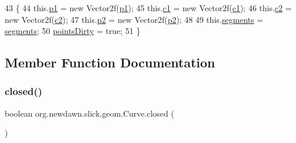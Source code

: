 \begin{DoxyCode}
43                                                                                    \{
44         this.\mbox{\hyperlink{classorg_1_1newdawn_1_1slick_1_1geom_1_1_curve_adb4d7ee49a8465099730d207e1edcdb9}{p1}} = \textcolor{keyword}{new} Vector2f(\mbox{\hyperlink{classorg_1_1newdawn_1_1slick_1_1geom_1_1_curve_adb4d7ee49a8465099730d207e1edcdb9}{p1}});
45         this.\mbox{\hyperlink{classorg_1_1newdawn_1_1slick_1_1geom_1_1_curve_aabfe639054bf41d5e2293bfa0190425b}{c1}} = \textcolor{keyword}{new} Vector2f(\mbox{\hyperlink{classorg_1_1newdawn_1_1slick_1_1geom_1_1_curve_aabfe639054bf41d5e2293bfa0190425b}{c1}});
46         this.\mbox{\hyperlink{classorg_1_1newdawn_1_1slick_1_1geom_1_1_curve_a7bfa1bc4b7842bd895dcd43300b9b7f7}{c2}} = \textcolor{keyword}{new} Vector2f(\mbox{\hyperlink{classorg_1_1newdawn_1_1slick_1_1geom_1_1_curve_a7bfa1bc4b7842bd895dcd43300b9b7f7}{c2}});
47         this.\mbox{\hyperlink{classorg_1_1newdawn_1_1slick_1_1geom_1_1_curve_a5ab730c076aab007199aa4555949fa02}{p2}} = \textcolor{keyword}{new} Vector2f(\mbox{\hyperlink{classorg_1_1newdawn_1_1slick_1_1geom_1_1_curve_a5ab730c076aab007199aa4555949fa02}{p2}});
48     
49         this.\mbox{\hyperlink{classorg_1_1newdawn_1_1slick_1_1geom_1_1_curve_aafd4d13898e228efd7a871e5755bfb02}{segments}} = \mbox{\hyperlink{classorg_1_1newdawn_1_1slick_1_1geom_1_1_curve_aafd4d13898e228efd7a871e5755bfb02}{segments}};
50         \mbox{\hyperlink{classorg_1_1newdawn_1_1slick_1_1geom_1_1_shape_a61fe1954d2fdefc72c34b284f4fcfdb4}{pointsDirty}} = \textcolor{keyword}{true};
51     \}
\end{DoxyCode}


\subsection{Member Function Documentation}
\mbox{\label{classorg_1_1newdawn_1_1slick_1_1geom_1_1_curve_a3a3600f92015fbab5637be02e2fe6e6c}} 
\subsubsection{\texorpdfstring{closed()}{closed()}}
{\footnotesize\ttfamily boolean org.\+newdawn.\+slick.\+geom.\+Curve.\+closed (\begin{DoxyParamCaption}{ }\end{DoxyParamCaption})\hspace{0.3cm}{\ttfamily [inline]}}


